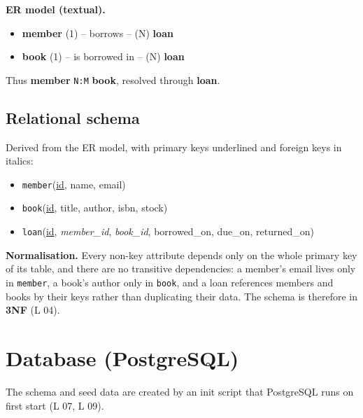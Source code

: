 \documentclass[11pt,a4paper]{article}
\begin{document}
\begin{beispielbox}
\textbf{ER model (textual).}
\begin{itemize}[leftmargin=1.4em, topsep=2pt]
  \item \textbf{member} (1) \;--\; borrows \;--\; (N) \textbf{loan}
  \item \textbf{book} (1) \;--\; is borrowed in \;--\; (N) \textbf{loan}
\end{itemize}
Thus \textbf{member} \texttt{N:M} \textbf{book}, resolved through
\textbf{loan}.
\end{beispielbox}

\subsection{Relational schema}

Derived from the ER model, with primary keys underlined and foreign keys in
italics:

\begin{itemize}[leftmargin=1.4em]
  \item \texttt{member}(\underline{id}, name, email)
  \item \texttt{book}(\underline{id}, title, author, isbn, stock)
  \item \texttt{loan}(\underline{id}, \emph{member\_id}, \emph{book\_id},
        borrowed\_on, due\_on, returned\_on)
\end{itemize}

\textbf{Normalisation.} Every non-key attribute depends only on the whole
primary key of its table, and there are no transitive dependencies: a member's
email lives only in \texttt{member}, a book's author only in \texttt{book}, and
a loan references members and books by their keys rather than duplicating their
data. The schema is therefore in \textbf{3NF} (L 04).

\section{Database (PostgreSQL)}

The schema and seed data are created by an init script that PostgreSQL runs on
first start (L 07, L 09).
\end{document}
